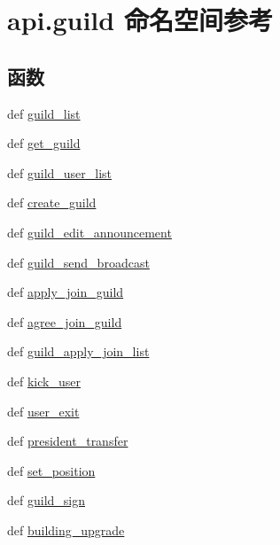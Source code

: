 \hypertarget{namespaceapi_1_1guild}{\section{api.\-guild 命名空间参考}
\label{namespaceapi_1_1guild}
}
\subsection*{函数}
\begin{DoxyCompactItemize}
\item 
def \hyperlink{namespaceapi_1_1guild_a26ee8b4f6365aa4fbfc07ec6ce3cee26}{guild\-\_\-list}
\item 
def \hyperlink{namespaceapi_1_1guild_a1b865d62035770affddc652d6a95c90d}{get\-\_\-guild}
\item 
def \hyperlink{namespaceapi_1_1guild_a6e3f42dc27f2dae9837f136f9944bf5e}{guild\-\_\-user\-\_\-list}
\item 
def \hyperlink{namespaceapi_1_1guild_a926f19be0ab3238d75037473cac13fe1}{create\-\_\-guild}
\item 
def \hyperlink{namespaceapi_1_1guild_a4d355dfccca47c12e9c17c0645828ee1}{guild\-\_\-edit\-\_\-announcement}
\item 
def \hyperlink{namespaceapi_1_1guild_a0c0cfb0421bba8b0839f03ec17b10029}{guild\-\_\-send\-\_\-broadcast}
\item 
def \hyperlink{namespaceapi_1_1guild_aa74d8b456f033ac48ae8007648b0165d}{apply\-\_\-join\-\_\-guild}
\item 
def \hyperlink{namespaceapi_1_1guild_af1c8622689f9bd55e39a485ba508d9ad}{agree\-\_\-join\-\_\-guild}
\item 
def \hyperlink{namespaceapi_1_1guild_a7a981e4eebc20a5ab40d22ed87986fac}{guild\-\_\-apply\-\_\-join\-\_\-list}
\item 
def \hyperlink{namespaceapi_1_1guild_aaf36d06bae9f40fd0cab153544e84da9}{kick\-\_\-user}
\item 
def \hyperlink{namespaceapi_1_1guild_addeeb9aba3786bf417dc81216253f48b}{user\-\_\-exit}
\item 
def \hyperlink{namespaceapi_1_1guild_aeef01a61b4b2e9b692aa4b26b477ce1e}{president\-\_\-transfer}
\item 
def \hyperlink{namespaceapi_1_1guild_a95a98a0a87d172af5c0b6b2365b8d7de}{set\-\_\-position}
\item 
def \hyperlink{namespaceapi_1_1guild_a40b8a3052c1d86f1bb2d0c0fec8815a2}{guild\-\_\-sign}
\item 
def \hyperlink{namespaceapi_1_1guild_ad16b2971430b298115d8ea9afa445e7b}{building\-\_\-upgrade}

\end{DoxyCompactItemize}
